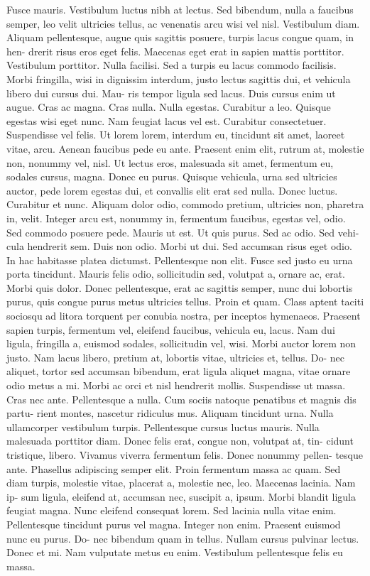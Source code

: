 \documentclass[draft,12pt,twoside,a4paper]{book}
\begin{document}
Fusce mauris. Vestibulum luctus nibh at lectus. Sed bibendum, nulla a faucibus semper, leo velit ultricies tellus, ac venenatis arcu wisi vel nisl. Vestibulum diam. Aliquam pellentesque, augue quis sagittis posuere, turpis lacus congue quam, in hen- drerit risus eros eget felis. Maecenas eget erat in sapien mattis porttitor. Vestibulum porttitor. Nulla facilisi. Sed a turpis eu lacus commodo facilisis. Morbi fringilla, wisi in dignissim interdum, justo lectus sagittis dui, et vehicula libero dui cursus dui. Mau- ris tempor ligula sed lacus. Duis cursus enim ut augue. Cras ac magna. Cras nulla.
Nulla egestas. Curabitur a leo. Quisque egestas wisi eget nunc. Nam feugiat lacus vel est. Curabitur consectetuer.
Suspendisse vel felis. Ut lorem lorem, interdum eu, tincidunt sit amet, laoreet vitae, arcu. Aenean faucibus pede eu ante. Praesent enim elit, rutrum at, molestie non, nonummy vel, nisl. Ut lectus eros, malesuada sit amet, fermentum eu, sodales cursus, magna. Donec eu purus. Quisque vehicula, urna sed ultricies auctor, pede lorem egestas dui, et convallis elit erat sed nulla. Donec luctus. Curabitur et nunc. Aliquam dolor odio, commodo pretium, ultricies non, pharetra in, velit. Integer arcu est, nonummy in, fermentum faucibus, egestas vel, odio.
Sed commodo posuere pede. Mauris ut est. Ut quis purus. Sed ac odio. Sed vehi- cula hendrerit sem. Duis non odio. Morbi ut dui. Sed accumsan risus eget odio. In hac habitasse platea dictumst. Pellentesque non elit. Fusce sed justo eu urna porta tincidunt. Mauris felis odio, sollicitudin sed, volutpat a, ornare ac, erat. Morbi quis dolor. Donec pellentesque, erat ac sagittis semper, nunc dui lobortis purus, quis congue purus metus ultricies tellus. Proin et quam. Class aptent taciti sociosqu ad litora torquent per conubia nostra, per inceptos hymenaeos. Praesent sapien turpis, fermentum vel, eleifend faucibus, vehicula eu, lacus.
Nam dui ligula, fringilla a, euismod sodales, sollicitudin vel, wisi. Morbi auctor lorem non justo. Nam lacus libero, pretium at, lobortis vitae, ultricies et, tellus. Do- nec aliquet, tortor sed accumsan bibendum, erat ligula aliquet magna, vitae ornare odio metus a mi. Morbi ac orci et nisl hendrerit mollis. Suspendisse ut massa. Cras nec ante. Pellentesque a nulla. Cum sociis natoque penatibus et magnis dis partu- rient montes, nascetur ridiculus mus. Aliquam tincidunt urna. Nulla ullamcorper vestibulum turpis. Pellentesque cursus luctus mauris.
Nulla malesuada porttitor diam. Donec felis erat, congue non, volutpat at, tin- cidunt tristique, libero. Vivamus viverra fermentum felis. Donec nonummy pellen- tesque ante. Phasellus adipiscing semper elit. Proin fermentum massa ac quam. Sed diam turpis, molestie vitae, placerat a, molestie nec, leo. Maecenas lacinia. Nam ip- sum ligula, eleifend at, accumsan nec, suscipit a, ipsum. Morbi blandit ligula feugiat magna. Nunc eleifend consequat lorem. Sed lacinia nulla vitae enim. Pellentesque tincidunt purus vel magna. Integer non enim. Praesent euismod nunc eu purus. Do- nec bibendum quam in tellus. Nullam cursus pulvinar lectus. Donec et mi. Nam vulputate metus eu enim. Vestibulum pellentesque felis eu massa.
\end{document}
